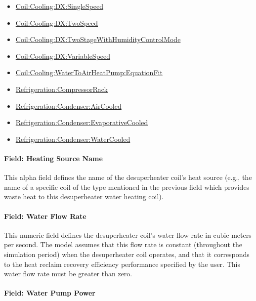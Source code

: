 \begin{itemize}
\item
  \hyperref[coilcoolingdxsinglespeed]{Coil:Cooling:DX:SingleSpeed}
\item
  \hyperref[coilcoolingdxtwospeed]{Coil:Cooling:DX:TwoSpeed}
\item
  \hyperref[coilcoolingdxtwostagewithhumiditycontrolmode]{Coil:Cooling:DX:TwoStageWithHumidityControlMode}
\item
  \hyperref[coilcoolingdxvariablespeed]{Coil:Cooling:DX:VariableSpeed}
\item
  \hyperref[coilcoolingwatertoairheatpumpequationfit]{Coil:Cooling:WaterToAirHeatPump:EquationFit}
\item
  \hyperref[refrigerationcompressorrack]{Refrigeration:CompressorRack}
\item
  \hyperref[refrigerationcondenseraircooled]{Refrigeration:Condenser:AirCooled}
\item
  \hyperref[refrigerationcondenserevaporativecooled]{Refrigeration:Condenser:EvaporativeCooled}
\item
  \hyperref[refrigerationcondenserwatercooled]{Refrigeration:Condenser:WaterCooled}
\end{itemize}

\paragraph{Field: Heating Source Name}\label{field-heating-source-name-1}

This alpha field defines the name of the desuperheater coil's heat source (e.g., the name of a specific coil of the type mentioned in the previous field which provides waste heat to this desuperheater water heating coil).

\paragraph{Field: Water Flow Rate}\label{field-water-flow-rate}

This numeric field defines the desuperheater coil's water flow rate in cubic meters per second. The model assumes that this flow rate is constant (throughout the simulation period) when the desuperheater coil operates, and that it corresponds to the heat reclaim recovery efficiency performance specified by the user. This water flow rate must be greater than zero.

\paragraph{Field: Water Pump Power}\label{field-water-pump-power}

